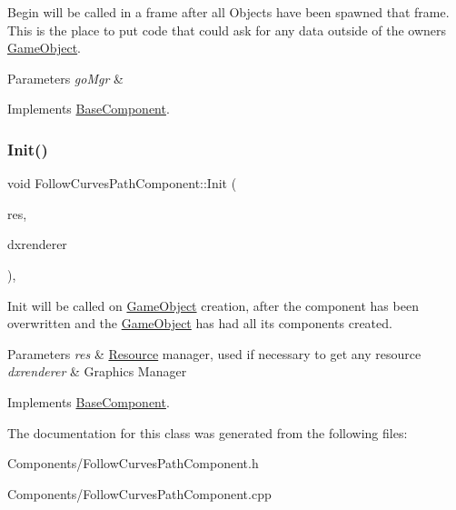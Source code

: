 Begin will be called in a frame after all Objects have been spawned that frame. This is the place to put code that could ask for any data outside of the owner\textquotesingle{}s \hyperlink{classGameObject}{Game\+Object}. 


\begin{DoxyParams}{Parameters}
{\em go\+Mgr} & \\
\hline
\end{DoxyParams}


Implements \hyperlink{classBaseComponent}{Base\+Component}.

\mbox{\label{classFollowCurvesPathComponent_aec67ef723e9aae80f28e76800d93f87c}} 
\subsubsection{\texorpdfstring{Init()}{Init()}}
{\footnotesize\ttfamily void Follow\+Curves\+Path\+Component\+::\+Init (\begin{DoxyParamCaption}\item[{\hyperlink{classResourceManager}{Resource\+Manager} $\ast$}]{res,  }\item[{\hyperlink{classDXRenderer}{D\+X\+Renderer} $\ast$}]{dxrenderer }\end{DoxyParamCaption})\hspace{0.3cm}{\ttfamily [override]}, {\ttfamily [virtual]}}



Init will be called on \hyperlink{classGameObject}{Game\+Object} creation, after the component has been overwritten and the \hyperlink{classGameObject}{Game\+Object} has had all its components created. 


\begin{DoxyParams}{Parameters}
{\em res} & \hyperlink{structResource}{Resource} manager, used if necessary to get any resource \\
\hline
{\em dxrenderer} & Graphic\textquotesingle{}s Manager \\
\hline
\end{DoxyParams}


Implements \hyperlink{classBaseComponent}{Base\+Component}.



The documentation for this class was generated from the following files\+:\begin{DoxyCompactItemize}
\item 
Components/Follow\+Curves\+Path\+Component.\+h\item 
Components/Follow\+Curves\+Path\+Component.\+cpp\end{DoxyCompactItemize}
